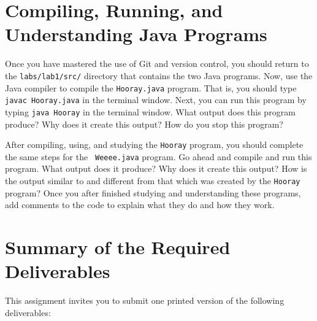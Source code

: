 \section*{Compiling, Running, and Understanding Java Programs}

  Once you have mastered the use of Git and version control, you should return to the {\tt labs/lab1/src/} directory that
  contains the two Java programs. Now, use the Java compiler to compile the {\tt Hooray.java} program.  That is, you
  should type {\tt javac Hooray.java} in the terminal window.  Next, you can run this program by typing {\tt java
  Hooray} in the terminal window.  What output does this program produce?  Why does it create this output? How do you
  stop this program? 

  After compiling, using, and studying the {\tt Hooray} program, you should complete the same steps for the {\tt
  Weeee.java} program. Go ahead and compile and run this program.  What output does it produce? Why does it create this
  output? How is the output similar to and different from that which was created by the {\tt Hooray} program? Once you
  after finished studying and understanding these programs, add comments to the code to explain what they do and how
  they work.
  

\section*{Summary of the Required Deliverables}

  This assignment invites you to submit one printed version of the following deliverables:

